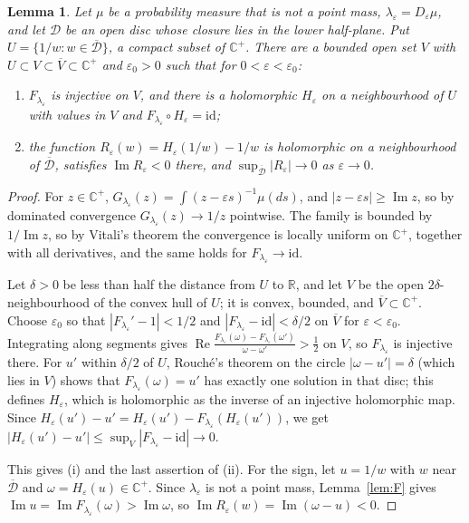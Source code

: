 \documentclass[11pt]{amsart}
\newtheorem{lemma}[theorem]{Lemma}
\theoremstyle{definition}
\theoremstyle{remark}
\numberwithin{equation}{section}
\newcommand{\R}{\mathbb{R}}
\newcommand{\Hp}{\mathbb{C}^+}
\newcommand{\eps}{\varepsilon}
\begin{document}
\begin{lemma}\label{lem:inverse}
Let $\mu$ be a probability measure that is not a point mass, $\lambda_\eps=D_\eps\mu$, and let $\mathcal D$ be an open disc whose closure lies in the lower half-plane. Put $U=\{1/w:w\in\overline{\mathcal D}\}$, a compact subset of $\Hp$. There are a bounded open set $V$ with $U\subset V\subset\overline V\subset\Hp$ and $\eps_0>0$ such that for $0<\eps<\eps_0$:
\begin{enumerate}[label=\textup{(\roman*)}]
\item $F_{\lambda_\eps}$ is injective on $V$, and there is a holomorphic $H_\eps$ on a neighbourhood of $U$ with values in $V$ and $F_{\lambda_\eps}\circ H_\eps=\mathrm{id}$;
\item the function $R_\eps(w)=H_\eps(1/w)-1/w$ is holomorphic on a neighbourhood of $\overline{\mathcal D}$, satisfies $\operatorname{Im}R_\eps<0$ there, and $\sup_{\overline{\mathcal D}}|R_\eps|\to0$ as $\eps\to0$.
\end{enumerate}
\end{lemma}

\begin{proof}
For $z\in\Hp$, $G_{\lambda_\eps}(z)=\int(z-\eps s)^{-1}\mu(ds)$, and $|z-\eps s|\ge\operatorname{Im}z$, so by dominated convergence $G_{\lambda_\eps}(z)\to1/z$ pointwise. The family is bounded by $1/\operatorname{Im}z$, so by Vitali's theorem the convergence is locally uniform on $\Hp$, together with all derivatives, and the same holds for $F_{\lambda_\eps}\to\mathrm{id}$.

Let $\delta>0$ be less than half the distance from $U$ to $\R$, and let $V$ be the open $2\delta$-neighbourhood of the convex hull of $U$; it is convex, bounded, and $\overline V\subset\Hp$. Choose $\eps_0$ so that $|F_{\lambda_\eps}'-1|<1/2$ and $|F_{\lambda_\eps}-\mathrm{id}|<\delta/2$ on $\overline V$ for $\eps<\eps_0$. Integrating along segments gives $\operatorname{Re}\frac{F_{\lambda_\eps}(\omega)-F_{\lambda_\eps}(\omega')}{\omega-\omega'}>\frac12$ on $V$, so $F_{\lambda_\eps}$ is injective there. For $u'$ within $\delta/2$ of $U$, Rouch\'e's theorem on the circle $|\omega-u'|=\delta$ (which lies in $V$) shows that $F_{\lambda_\eps}(\omega)=u'$ has exactly one solution in that disc; this defines $H_\eps$, which is holomorphic as the inverse of an injective holomorphic map. Since $H_\eps(u')-u'=H_\eps(u')-F_{\lambda_\eps}(H_\eps(u'))$, we get $|H_\eps(u')-u'|\le\sup_{V}|F_{\lambda_\eps}-\mathrm{id}|\to0$.

This gives (i) and the last assertion of (ii). For the sign, let $u=1/w$ with $w$ near $\overline{\mathcal D}$ and $\omega=H_\eps(u)\in\Hp$. Since $\lambda_\eps$ is not a point mass, Lemma~\ref{lem:F} gives $\operatorname{Im}u=\operatorname{Im}F_{\lambda_\eps}(\omega)>\operatorname{Im}\omega$, so $\operatorname{Im}R_\eps(w)=\operatorname{Im}(\omega-u)<0$.
\end{proof}
\end{document}
